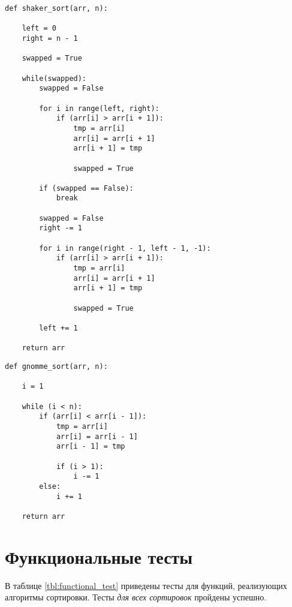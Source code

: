 \begin{lstlisting}[label=lst:shaker_sort,caption=Алгоритм сортировки перемешиванием]
    def shaker_sort(arr, n):

    left = 0
    right = n - 1

    swapped = True

    while(swapped):
        swapped = False

        for i in range(left, right):
            if (arr[i] > arr[i + 1]):
                tmp = arr[i]
                arr[i] = arr[i + 1]
                arr[i + 1] = tmp

                swapped = True

        if (swapped == False):
            break

        swapped = False
        right -= 1

        for i in range(right - 1, left - 1, -1):
            if (arr[i] > arr[i + 1]):
                tmp = arr[i]
                arr[i] = arr[i + 1]
                arr[i + 1] = tmp

                swapped = True

        left += 1

    return arr
\end{lstlisting}


\begin{lstlisting}[label=lst:gnomme_sort,caption=Алгоритм гномьей сортировки]
    def gnomme_sort(arr, n):
    
    i = 1

    while (i < n):
        if (arr[i] < arr[i - 1]):
            tmp = arr[i]
            arr[i] = arr[i - 1]
            arr[i - 1] = tmp

            if (i > 1):
                i -= 1
        else:
            i += 1

    return arr
\end{lstlisting}


\section{Функциональные тесты}

В таблице \ref{tbl:functional_test} приведены тесты для функций, реализующих алгоритмы сортировки. Тесты \textit{для всех сортировок} пройдены успешно.


